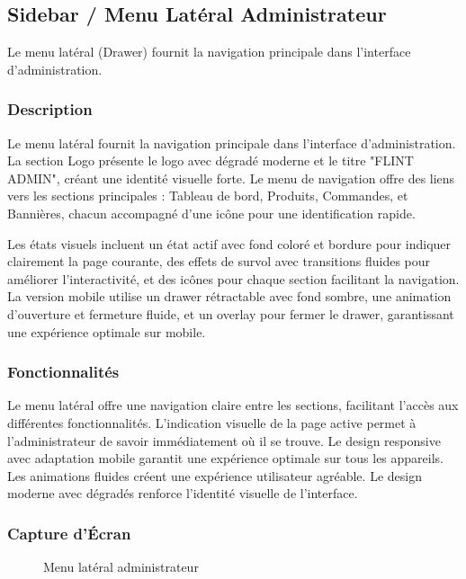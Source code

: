 \documentclass[12pt,a4paper]{article}
\begin{document}
\subsection{Sidebar / Menu Latéral Administrateur}

Le menu latéral (Drawer) fournit la navigation principale dans l'interface d'administration.

\subsubsection{Description}

Le menu latéral fournit la navigation principale dans l'interface d'administration. La section Logo présente le logo avec dégradé moderne et le titre "FLINT ADMIN", créant une identité visuelle forte. Le menu de navigation offre des liens vers les sections principales : Tableau de bord, Produits, Commandes, et Bannières, chacun accompagné d'une icône pour une identification rapide.

Les états visuels incluent un état actif avec fond coloré et bordure pour indiquer clairement la page courante, des effets de survol avec transitions fluides pour améliorer l'interactivité, et des icônes pour chaque section facilitant la navigation. La version mobile utilise un drawer rétractable avec fond sombre, une animation d'ouverture et fermeture fluide, et un overlay pour fermer le drawer, garantissant une expérience optimale sur mobile.

\subsubsection{Fonctionnalités}

Le menu latéral offre une navigation claire entre les sections, facilitant l'accès aux différentes fonctionnalités. L'indication visuelle de la page active permet à l'administrateur de savoir immédiatement où il se trouve. Le design responsive avec adaptation mobile garantit une expérience optimale sur tous les appareils. Les animations fluides créent une expérience utilisateur agréable. Le design moderne avec dégradés renforce l'identité visuelle de l'interface.

\subsubsection{Capture d'Écran}

\begin{figure}[H]
    \centering
    \caption{Menu latéral administrateur}
    \label{fig:admin-sidebar}
\end{figure}
\end{document}

